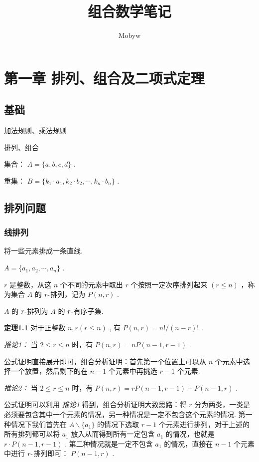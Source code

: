 \documentclass[cn, hazy, blue, normal, 12pt]{elegantnote}
\title{组合数学笔记}
\author{Mobyw}
\institute{Created by Elegant\LaTeX{}}
\date{\zhtoday}
\begin{document}
\maketitle

\section{第一章 排列、组合及二项式定理}

\subsection{基础}

加法规则、乘法规则

排列、组合

集合： $ A=\{a,b,c,d\} $ .

重集： $ B=\{k_1\cdot a_1,k_2\cdot b_2,\cdots,k_n\cdot b_n\} $ .

\subsection{排列问题}

\subsubsection{线排列}

将一些元素排成一条直线.

$ A=\{a_1,a_2,\cdots,a_n\} $ .

$ r $ 是整数，从这 $ n $ 个不同的元素中取出 $ r $ 个按照一定次序排列起来 $ (r\leq n) $ ，称为集合 $ A $ 的 $ r{\text -} $排列，记为 $ P(n,r) $ .

$ A $ 的 $ r{\text -} $排列为 $ A $ 的 $ r{\text -} $有序子集.

\textbf{定理1.1} 对于正整数 $ n,r (r\leq n) $ , 有 $ P(n,r)=n!/(n-r)! $  .

\textit{推论1：} 当 $ 2\leq r \leq n $ 时，有   $ P(n,r)=nP(n-1,r-1) $ .

公式证明直接展开即可，组合分析证明：首先第一个位置上可以从 $ n $ 个元素中选择一个放置，然后剩下的在 $ n-1 $ 个元素中再挑选 $ r-1 $ 个元素.

\textit{推论2：} 当 $ 2\leq r \leq n $ 时，有  $ P(n,r)=rP(n-1,r-1) + P(n-1,r) $ .

公式证明可以利用 \textit{推论1} 得到，组合分析证明大致思路：将 $ r $ 分为两类，一类是必须要包含其中一个元素的情况，另一种情况是一定不包含这个元素的情况. 第一种情况下我们首先在 $ A\backslash \{a_1\} $ 的情况下选取 $ r-1 $ 个元素进行排列，对于上述的所有排列都可以将 $ a_1 $ 放入从而得到所有一定包含 $ a_1 $ 的情况，也就是 $ r\cdot P(n-1,r-1) $ . 第二种情况就是一定不包含 $ a_1 $ 的情况，直接在 $ n-1 $ 个元素中进行 $ r{\text -} $排列即可： $ P(n-1,r) $ .
\end{document}
